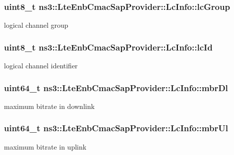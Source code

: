 \subsubsection[{\texorpdfstring{lc\+Group}{lcGroup}}]{\setlength{\rightskip}{0pt plus 5cm}uint8\+\_\+t ns3\+::\+Lte\+Enb\+Cmac\+Sap\+Provider\+::\+Lc\+Info\+::lc\+Group}\hypertarget{structns3_1_1LteEnbCmacSapProvider_1_1LcInfo_a3d9ae15a992e5f03d9fbabc600491dd6}{}\label{structns3_1_1LteEnbCmacSapProvider_1_1LcInfo_a3d9ae15a992e5f03d9fbabc600491dd6}
logical channel group 
\subsubsection[{\texorpdfstring{lc\+Id}{lcId}}]{\setlength{\rightskip}{0pt plus 5cm}uint8\+\_\+t ns3\+::\+Lte\+Enb\+Cmac\+Sap\+Provider\+::\+Lc\+Info\+::lc\+Id}\hypertarget{structns3_1_1LteEnbCmacSapProvider_1_1LcInfo_a5fd3cd842409e94a98c903b4d56069f4}{}\label{structns3_1_1LteEnbCmacSapProvider_1_1LcInfo_a5fd3cd842409e94a98c903b4d56069f4}
logical channel identifier 
\subsubsection[{\texorpdfstring{mbr\+Dl}{mbrDl}}]{\setlength{\rightskip}{0pt plus 5cm}uint64\+\_\+t ns3\+::\+Lte\+Enb\+Cmac\+Sap\+Provider\+::\+Lc\+Info\+::mbr\+Dl}\hypertarget{structns3_1_1LteEnbCmacSapProvider_1_1LcInfo_a06321acdb40866a5c02784d8afdb9aa9}{}\label{structns3_1_1LteEnbCmacSapProvider_1_1LcInfo_a06321acdb40866a5c02784d8afdb9aa9}
maximum bitrate in downlink 
\subsubsection[{\texorpdfstring{mbr\+Ul}{mbrUl}}]{\setlength{\rightskip}{0pt plus 5cm}uint64\+\_\+t ns3\+::\+Lte\+Enb\+Cmac\+Sap\+Provider\+::\+Lc\+Info\+::mbr\+Ul}\hypertarget{structns3_1_1LteEnbCmacSapProvider_1_1LcInfo_a36321cf8d2546e0826b56ab69b0eee67}{}\label{structns3_1_1LteEnbCmacSapProvider_1_1LcInfo_a36321cf8d2546e0826b56ab69b0eee67}
maximum bitrate in uplink 
